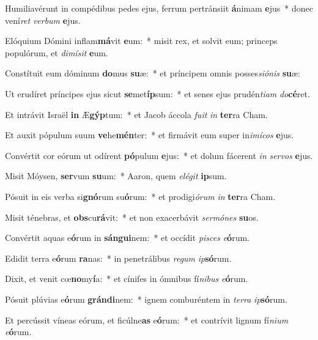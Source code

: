 \item Humiliavérunt in compédibus pedes ejus, ferrum pertránsiit \textbf{á}nimam \textbf{e}jus~* donec vení\textit{ret} \textit{ver}\textit{bum} \textbf{e}jus.
\item Elóquium Dómini inflam\textbf{má}vit \textbf{e}um:~* misit rex, et solvit eum; princeps populórum, et \textit{di}\textit{mí}\textit{sit} \textbf{e}um.
\item Constítuit eum dóminum \textbf{do}mus \textbf{su}æ:~* et príncipem omnis posses\textit{si}\textit{ó}\textit{nis} \textbf{su}æ:
\item Ut erudíret príncipes ejus sicut \textbf{se}met\textbf{íp}sum:~* et senes ejus prudén\textit{ti}\textit{am} \textit{do}\textbf{cé}ret.
\item Et intrávit Israël \textbf{in} Æ\textbf{gýp}tum:~* et Jacob áccola \textit{fu}\textit{it} \textit{in} \textbf{ter}ra Cham.
\item Et auxit pópulum suum \textbf{ve}he\textbf{mén}ter:~* et firmávit eum super in\textit{i}\textit{mí}\textit{cos} \textbf{e}jus.
\item Convértit cor eórum ut odírent \textbf{pó}pulum \textbf{e}jus:~* et dolum fácerent \textit{in} \textit{ser}\textit{vos} \textbf{e}jus.
\item Misit Móysen, \textbf{ser}vum \textbf{su}um:~* Aaron, quem \textit{e}\textit{lé}\textit{git} \textbf{ip}sum.
\item Pósuit in eis verba si\textbf{gnó}rum su\textbf{ó}rum:~* et prodigi\textit{ó}\textit{rum} \textit{in} \textbf{ter}ra Cham.
\item Misit ténebras, et \textbf{obs}cu\textbf{rá}vit:~* et non exacerbávit \textit{ser}\textit{mó}\textit{nes} \textbf{su}os.
\item Convértit aquas e\textbf{ó}rum in \textbf{sán}\textbf{gui}nem:~* et occídit \textit{pi}\textit{sces} \textit{e}\textbf{ó}rum.
\item Edidit terra e\textbf{ó}rum \textbf{ra}nas:~* in penetrálibus \textit{re}\textit{gum} \textit{ip}\textbf{só}rum.
\item Dixit, et venit cœ\textbf{no}my\textbf{í}a:~* et cínifes in ómnibus fí\textit{ni}\textit{bus} \textit{e}\textbf{ó}rum.
\item Pósuit plúvias e\textbf{ó}rum \textbf{grán}\textbf{di}nem:~* ignem comburéntem in \textit{ter}\textit{ra} \textit{ip}\textbf{só}rum.
\item Et percússit víneas eórum, et ficúlne\textbf{as} e\textbf{ó}rum:~* et contrívit lignum fí\textit{ni}\textit{um} \textit{e}\textbf{ó}rum.
